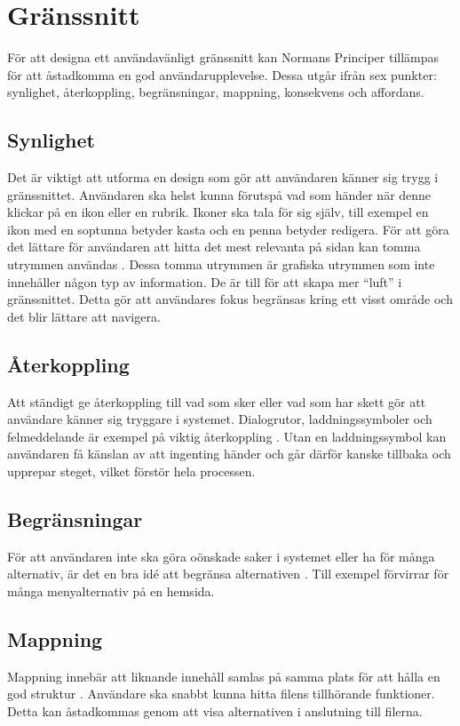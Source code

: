 \section{Gränssnitt}
För att designa ett användavänligt gränssnitt kan Normans Principer\cite{norman} tillämpas för att åstadkomma en god användarupplevelse. Dessa utgår ifrån sex punkter: synlighet, återkoppling, begränsningar, mappning, konsekvens och affordans.

\subsection{Synlighet}
Det är viktigt att utforma en design som gör att användaren känner sig trygg i gränssnittet. Användaren ska helst kunna förutspå vad som händer när denne klickar på en ikon eller en rubrik. Ikoner ska tala för sig själv, till exempel en ikon med en soptunna betyder kasta och en penna betyder redigera. För att göra det lättare för användaren att hitta det mest relevanta på sidan kan tomma utrymmen användas \cite{whitespace}. Dessa tomma utrymmen är grafiska utrymmen som inte innehåller någon typ av information. De är till för att skapa mer “luft” i gränssnittet. Detta gör att användares fokus begränsas kring ett visst område och det blir lättare att navigera.

\subsection{Återkoppling}
Att ständigt ge återkoppling till vad som sker eller vad som har skett gör att användare känner sig tryggare i systemet. Dialogrutor, laddningssymboler och felmeddelande är exempel på viktig återkoppling \cite{whitespace}. Utan en laddningssymbol kan användaren få känslan av att ingenting händer och går därför kanske tillbaka och upprepar steget, vilket förstör hela processen.

\subsection{Begränsningar}
För att användaren inte ska göra oönskade saker i systemet eller ha för många alternativ, är det en bra idé att begränsa alternativen \cite{whitespace}. Till exempel förvirrar för många menyalternativ på en hemsida. 

\subsection{Mappning}
Mappning innebär att liknande innehåll samlas på samma plats för att hålla en god struktur \cite{whitespace}. Användare ska snabbt kunna hitta filens tillhörande funktioner. Detta kan åstadkommas genom att visa alternativen i anslutning till filerna. 


